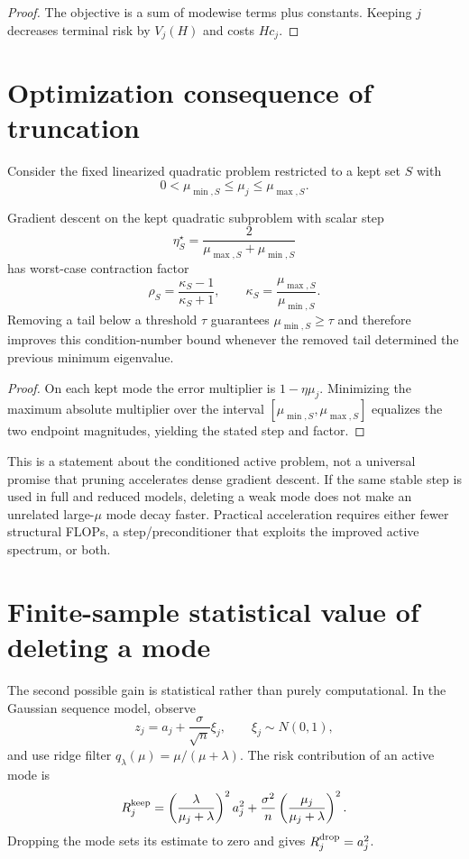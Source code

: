 \begin{proof}
The objective is a sum of modewise terms plus constants. Keeping $j$ decreases terminal risk by $V_j(H)$ and costs $Hc_j$.
\end{proof}

\section{Optimization consequence of truncation}
Consider the fixed linearized quadratic problem restricted to a kept set $S$ with
\[
0<\mu_{\min,S}\le\mu_j\le\mu_{\max,S}.
\]

\begin{proposition}\label{prop:conditioning}
Gradient descent on the kept quadratic subproblem with scalar step
\[
\eta_S^\star=\frac{2}{\mu_{\max,S}+\mu_{\min,S}}
\]
has worst-case contraction factor
\[
\rho_S=\frac{\kappa_S-1}{\kappa_S+1},
\qquad
\kappa_S=\frac{\mu_{\max,S}}{\mu_{\min,S}}.
\]
Removing a tail below a threshold $\tau$ guarantees $\mu_{\min,S}\ge\tau$ and therefore improves this condition-number bound whenever the removed tail determined the previous minimum eigenvalue.
\end{proposition}

\begin{proof}
On each kept mode the error multiplier is $1-\eta\mu_j$. Minimizing the maximum absolute multiplier over the interval $[\mu_{\min,S},\mu_{\max,S}]$ equalizes the two endpoint magnitudes, yielding the stated step and factor.
\end{proof}

\begin{remark}
This is a statement about the conditioned active problem, not a universal promise that pruning accelerates dense gradient descent. If the same stable step is used in full and reduced models, deleting a weak mode does not make an unrelated large-$\mu$ mode decay faster. Practical acceleration requires either fewer structural FLOPs, a step/preconditioner that exploits the improved active spectrum, or both.
\end{remark}

\section{Finite-sample statistical value of deleting a mode}
The second possible gain is statistical rather than purely computational. In the Gaussian sequence model, observe
\[
z_j=a_j+\frac{\sigma}{\sqrt n}\xi_j,
\qquad \xi_j\sim N(0,1),
\]
and use ridge filter $q_\lambda(\mu)=\mu/(\mu+\lambda)$. The risk contribution of an active mode is
\[
R_j^{\rm keep}
=\left(\frac{\lambda}{\mu_j+\lambda}\right)^2a_j^2
+\frac{\sigma^2}{n}\left(\frac{\mu_j}{\mu_j+\lambda}\right)^2.
\]
Dropping the mode sets its estimate to zero and gives $R_j^{\rm drop}=a_j^2$.

